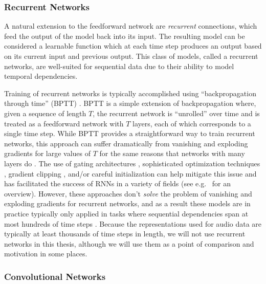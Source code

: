 \subsubsection{Recurrent Networks}

A natural extension to the feedforward network are {\em recurrent} connections, which feed the output of the model back into its input.
The resulting model can be considered a learnable function which at each time step produces an output based on its current input and previous output.
This class of models, called a recurrent networks, are well-suited for sequential data due to their ability to model temporal dependencies.

Training of recurrent networks is typically accomplished using ``backpropagation through time'' (BPTT) \cite{}.
BPTT is a simple extension of backpropagation where, given a sequence of length $T$, the recurrent network is ``unrolled'' over time and is treated as a feedforward network with $T$ layers, each of which corresponds to a single time step.
While BPTT provides a straightforward way to train recurrent networks, this approach can suffer dramatically from vanishing and exploding gradients for large values of $T$ for the same reasons that networks with many layers do \cite{}.
The use of gating architectures \cite{hochreiter1997long,cho2014learning}, sophisticated optimization techniques \cite{martens2011learning,sutskever2013importance}, gradient clipping \cite{pascanu2012difficulty,graves2013generating}, and/or careful initialization \cite{sutskever2013importance,jaegar2012long,mikolov2014learning,le2015simple} can help mitigate this issue and has facilitated the success of RNNs in a variety of fields (see e.g.\ \cite{graves2012supervised} for an overview).
However, these approaches don't {\em solve} the problem of vanishing and exploding gradients for recurrent networks, and as a result these models are in practice typically only applied in tasks where sequential dependencies span at most hundreds of time steps \cite{martens2011learning,sutskever2013importance,le2015simple,hochreiter1997long,krueger2015regularizing,arjovsky2015unitary}.
Because the representations used for audio data are typically at least thousands of time steps in length, we will not use recurrent networks in this thesis, although we will use them as a point of comparison and motivation in some places.

\subsubsection{Convolutional Networks}

